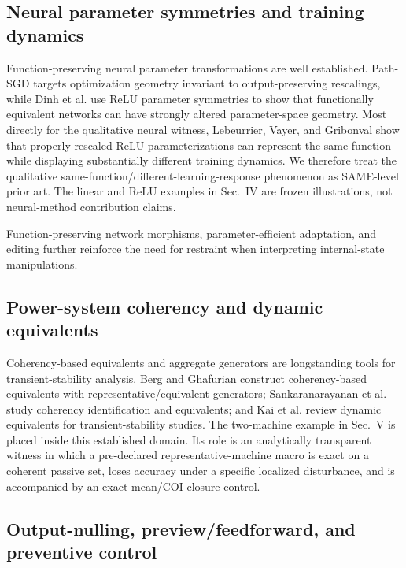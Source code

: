 \subsection{Neural parameter symmetries and training dynamics}

Function-preserving neural parameter transformations are well established. Path-SGD targets optimization geometry invariant to output-preserving rescalings, while Dinh et al. use ReLU parameter symmetries to show that functionally equivalent networks can have strongly altered parameter-space geometry.\cite{Neyshabur2015,Dinh2017} Most directly for the qualitative neural witness, Lebeurrier, Vayer, and Gribonval show that properly rescaled ReLU parameterizations can represent the same function while displaying substantially different training dynamics.\cite{Lebeurrier2026} We therefore treat the qualitative same-function/different-learning-response phenomenon as SAME-level prior art. The linear and ReLU examples in Sec.~IV are frozen illustrations, not neural-method contribution claims.

Function-preserving network morphisms, parameter-efficient adaptation, and editing further reinforce the need for restraint when interpreting internal-state manipulations.\cite{Chen2016,Wei2016,Jacot2018,Hu2022,Meng2022}

\subsection{Power-system coherency and dynamic equivalents}

Coherency-based equivalents and aggregate generators are longstanding tools for transient-stability analysis. Berg and Ghafurian construct coherency-based equivalents with representative/equivalent generators; Sankaranarayanan et al. study coherency identification and equivalents; and Kai et al. review dynamic equivalents for transient-stability studies.\cite{BergGhafurian1983,Sankaranarayanan1983,Kai2022} The two-machine example in Sec.~V is placed inside this established domain. Its role is an analytically transparent witness in which a pre-declared representative-machine macro is exact on a coherent passive set, loses accuracy under a specific localized disturbance, and is accompanied by an exact mean/COI closure control.

\subsection{Output-nulling, preview/feedforward, and preventive control}

